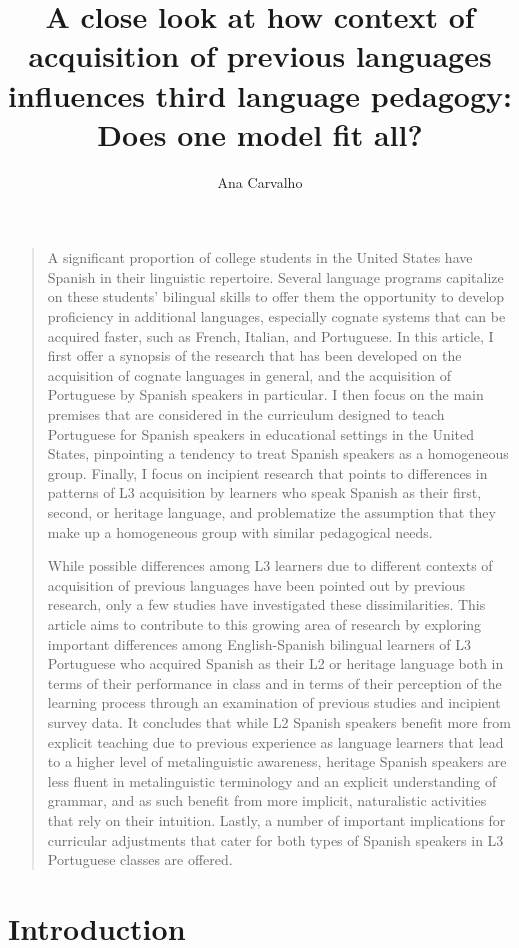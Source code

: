\documentclass[output=paper]{../langscibook}
\author{Ana Carvalho\affiliation{University of Arizona}}
\title{A close look at how context of acquisition of previous languages influences third language pedagogy: Does one model fit all?}
\begin{document}
\vspace{-2\baselineskip}
\begin{quote}\small
 {A significant proportion of college students in the United States have Spanish in their linguistic repertoire. Several language programs capitalize on these students’ bilingual skills to offer them the opportunity to develop proficiency in additional languages, especially cognate systems that can be acquired faster, such as French, Italian, and Portuguese. In this article, I first offer a synopsis of the research that has been developed on the acquisition of cognate languages in general, and the acquisition of Portuguese by Spanish speakers in particular. I then focus on the main premises that are considered in the curriculum designed to teach Portuguese for Spanish speakers in educational settings in the United States, pinpointing a tendency to treat Spanish speakers as a homogeneous group. Finally, I focus on incipient research that points to differences in patterns of L3 acquisition by learners who speak Spanish as their first, second, or heritage language, and problematize the assumption that they make up a homogeneous group with similar pedagogical needs.

  While possible differences among L3 learners due to different contexts of acquisition of previous languages have been pointed out by previous research, only a few studies have investigated these dissimilarities. This article aims to contribute to this growing area of research by exploring important differences among English-Spanish bilingual learners of L3 Portuguese who acquired Spanish as their L2 or heritage language both in terms of their performance in class and in terms of their perception of the learning process through an examination of previous studies and incipient survey data. It concludes that while L2 Spanish speakers benefit more from explicit teaching due to previous experience as language learners that lead to a higher level of metalinguistic awareness, heritage Spanish speakers are less fluent in metalinguistic terminology and an explicit understanding of grammar, and as such benefit from more implicit, naturalistic activities that rely on their intuition. Lastly, a number of important implications for curricular adjustments that cater for both types of Spanish speakers in L3 Portuguese classes are offered.}
\end{quote}

 \section{Introduction}
\end{document}
